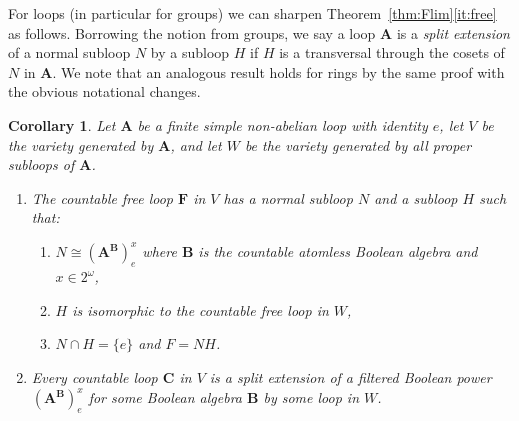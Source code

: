 \documentclass[12pt,a4paper,reqno]{amsart}
\numberwithin{equation}{section}
\theoremstyle{plain}
\newtheorem{cor}[thm]{Corollary}
\theoremstyle{definition}
\newcommand{\A}{\mathbf{A}}
\newcommand{\B}{\mathbf{B}}
\newcommand{\C}{\mathbf{C}}
\newcommand{\F}{\mathbf{F}}
\begin{document}
 For loops (in particular for groups) we can sharpen Theorem~\ref{thm:Flim}\eqref{it:free} as follows.
 Borrowing the notion from groups, we say a loop $\A$ is a \emph{split extension} of a normal subloop
  $N$ by a subloop $H$ if $H$ is a transversal through the cosets of $N$ in $\A$.
  We note that an analogous result holds for rings by the same proof with the obvious notational changes.
 
 
\begin{cor} \label{cor:group}
 Let $\A$ be a finite simple non-abelian loop with identity $e$,
 let $V$ be the variety generated by $\A$, and
 let $W$ be the variety generated by all proper subloops of $\A$.
\begin{enumerate}
\item \label{it:countable}
 The countable free loop $\F$ in $V$ has a normal subloop $N$ and a subloop $H$ such that:
\begin{enumerate} 
\item \label{it:kernel}
  $N\cong (\A^\B)^{x}_e$ where $\B$ is the countable atomless Boolean algebra and $x\in 2^\omega$,
\item \label{it:complement}
 $H$ is isomorphic to the countable free loop in $W$,
\item \label{it:semidirect}
$N\cap H = \{e\}$ and $F=NH$. 
\end{enumerate}
\item \label{it:V}
 Every countable loop $\C$ in $V$ is a split extension of a filtered Boolean power $(\A^\B)^x_e$
 for some Boolean algebra $\B$ by some loop in $W$.
\end{enumerate}
\end{cor}
\end{document}
